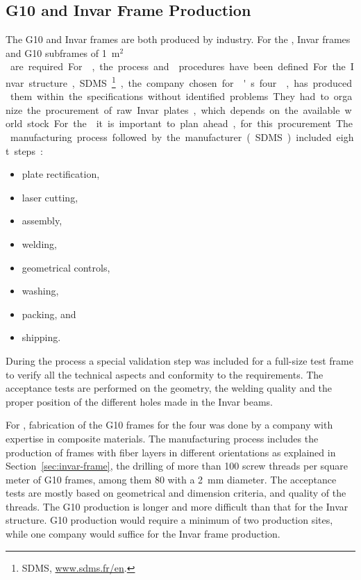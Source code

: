 \subsection{G10 and Invar Frame Production}
\label{sec:fddp-crp-frame}

The G10 and Invar frames are both produced by industry. For the , %
\dptotcrp Invar frames and \dpnumpmtch %
G10 subframes of \SI{1}{m$^2$} are required. %
For , the process and  procedures have been defined.
For the Invar structure, SDMS\footnote{SDMS\texttrademark{}, \url{www.sdms.fr/en}.}, the company chosen for 's four ,  %
has produced them within the specifications without identified problems.
They had to organize the procurement of raw Invar plates, which depends on the available world stock. For the  it is important to plan ahead, %
 for this procurement. 
The manufacturing process followed by the manufacturer (SDMS) included eight steps:\\
\begin{itemize}
\item plate rectification,
\item  laser cutting,
\item  assembly,
\item  welding,
\item  geometrical controls,
\item  washing,
\item  packing, and
\item  shipping.
\end{itemize}

During the process a special validation step was included  for a full-size test frame to verify all the technical aspects and conformity to the requirements. 
The acceptance tests are performed on the geometry, the welding quality and the proper position of the different holes made in the Invar beams.

For , fabrication of the G10 frames for the four  was done by a company with expertise in composite materials. The manufacturing process includes the %
production of frames with fiber layers in different orientations as explained in Section~\ref{sec:invar-frame}, the drilling of more than \num{100} screw threads per square meter of G10 frames, among them \num{80} with a \SI{2}{mm} diameter.
The acceptance tests are mostly based on geometrical and dimension criteria, and quality of the threads.  
The G10 production is longer and more difficult than that for the Invar structure. G10 production would require a minimum of two production sites, while one company would suffice for the Invar frame production.


